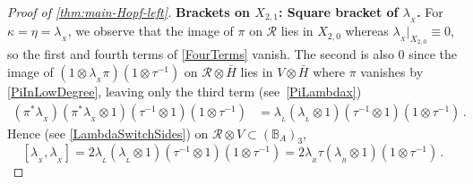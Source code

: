 \documentclass[11pt]{amsart}
\numberwithin{equation}{section}
\newcommand{\X}{_X}
\newcommand{\lambdax}{\lambda_{\X}}
\newcommand{\gammax}{\kappa} %
\newcommand{\etax}{\eta}
\newcommand{\R}{\mathcal{R}}
\newcommand{\BB}{\mathbb{B}} %
\newcommand{\itau}{{\tau^{-1}}}%
\renewcommand{\_}[1]{\mbox{$_{\left( #1 \right)}$}}
\newcommand{\ot}{\otimes}
\begin{document}
{\begin{proof}[Proof of \cref{thm:main-Hopf-left}]
  {\bf Brackets on $X_{2,1}$: Square bracket of $\lambdax$.}
 For $\gammax=\etax=\lambdax$, we observe that 
the image of $\pi$ on $\R$ lies in $X_{2,0}$ whereas $\lambdax|_{X_{2,0}}\equiv 0$,
so the first and fourth terms of  
\cref{FourTerms} vanish.
The second is also $0$ since the image of
$(1\ot \lambdax\pi)(1\ot\itau)$ on $\R\ot \bar
H$
lies in $V\ot \bar H$ where $\pi$ vanishes by \cref{PiInLowDegree},
leaving only the third term 
(see~\cref{PiLambdax})
  $$
  \begin{aligned}
    (\pi^*\lambdax) (\pi^*\lambdax\ot 1)(\itau\ot 1)(1\ot\itau)
     &=
    \lambda_{_L} (\lambda_{_L}\ot 1) (\itau\ot 1)(1\ot \itau)
    \, .
   \end{aligned}
   $$
   Hence (see \cref{LambdaSwitchSides})
   on $\R\ot V\subset (\BB_A)_3$,
   $$
  [\lambdax,\lambdax] 
   = 2 \lambda_{_L} (\lambda_{_L}\ot 1) (\itau\ot 1)(1\ot\itau)
= 2 \lambda_{_R} \tau (\lambda_{_R}\ot 1)(1\ot\itau)
   \, .
   $$


\end{proof}}
\end{document}
